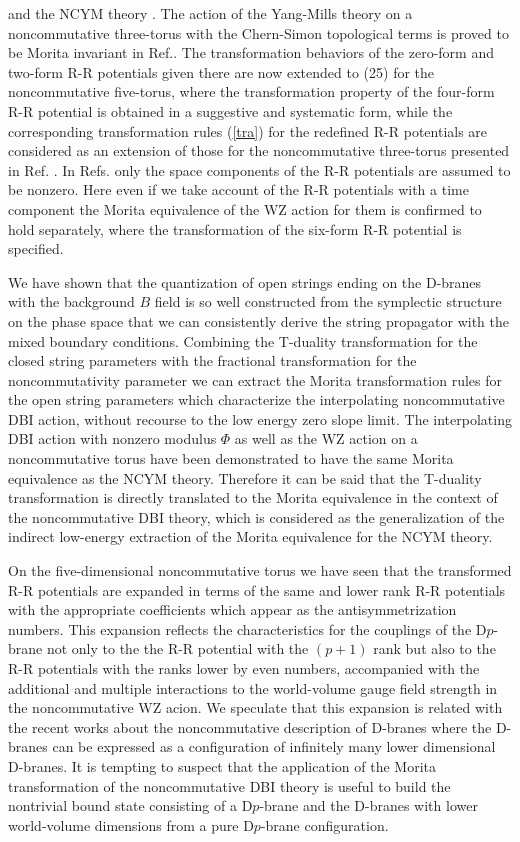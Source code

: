 \documentclass[12pt,a4paper]{article}
\begin{document}
\cite{HV} and the NCYM theory \cite{PH,BM,KS}.
The action of the Yang-Mills theory on a noncommutative three-torus with
the Chern-Simon topological terms is proved to be Morita invariant in
Ref.\cite{BMZ}. The transformation behaviors of the zero-form and two-form
R-R potentials given there are now extended to (25) for the 
noncommutative five-torus, where the transformation property of the
four-form R-R potential is obtained in a suggestive and systematic
form, while the corresponding transformation rules (\ref{tra}) for the 
redefined R-R potentials are considered as an extension of those for 
the noncommutative three-torus presented in Ref. \cite{KS}.
In Refs. \cite{KS,BMZ} only the space components of the R-R potentials
are assumed to be nonzero. Here even if we take account of the R-R 
potentials with a time component the Morita equivalence of the WZ action
for them is confirmed to hold separately, where the transformation of 
the six-form R-R potential is specified.

We have shown that the quantization of open strings ending on the 
D-branes with the background $B$ field is so well constructed
from the symplectic structure on the phase space that
we can consistently derive the string propagator with the mixed boundary
conditions. Combining the T-duality transformation for the closed string
parameters with the fractional transformation for the noncommutativity
parameter we can extract the Morita transformation rules for the open
string parameters which characterize the interpolating noncommutative
DBI action, without recourse to the low energy zero slope limit.
The interpolating DBI action with nonzero modulus $\Phi$ as well as
the WZ action on a noncommutative torus have been demonstrated to have
the same Morita equivalence as the NCYM theory. Therefore 
it can be said that the T-duality transformation is 
directly translated to the Morita equivalence in the context of 
the noncommutative DBI theory, which is considered as the generalization
of the indirect low-energy extraction of the Morita equivalence
for the NCYM theory. 

On the five-dimensional noncommutative torus
we have seen that the transformed R-R potentials are expanded in 
terms of the same and lower rank R-R potentials with the appropriate
coefficients which appear as the antisymmetrization numbers.
This expansion reflects the characteristics for the couplings of the
D$p$-brane not only to the the R-R potential with the $(p+1)$ rank 
but also to the R-R potentials with the ranks lower 
by even numbers, accompanied with the additional and
multiple interactions to the world-volume gauge field strength
in the noncommutative WZ acion. 
We speculate that this expansion is related with the recent
works about the noncommutative description of D-branes 
\cite{ICSK} where the D-branes can be expressed as a configuration of
infinitely many lower dimensional D-branes.
It is tempting to suspect
that the application of the Morita transformation of the
noncommutative DBI theory is useful to build the nontrivial
bound state consisting of a D$p$-brane and the D-branes with lower 
world-volume dimensions from a pure D$p$-brane configuration.
\end{document}

